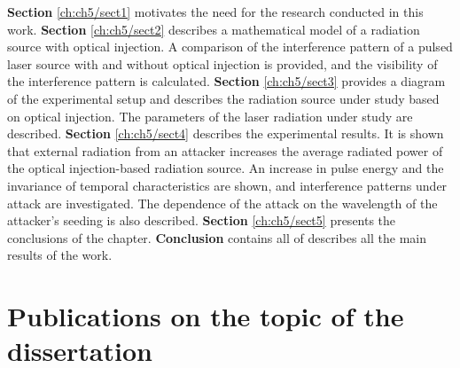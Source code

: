 \newline \textbf{Section} \ref{ch:ch5/sect1} motivates the need for the research conducted in this work.
\newline \textbf{Section} \ref{ch:ch5/sect2} describes a mathematical model of a radiation source with optical injection. A comparison of the interference pattern of a pulsed laser source with and without optical injection is provided, and the visibility of the interference pattern is calculated.
\newline \textbf{Section} \ref{ch:ch5/sect3} provides a diagram of the experimental setup and describes the radiation source under study based on optical injection. The parameters of the laser radiation under study are described.
\newline \textbf{Section} \ref{ch:ch5/sect4} describes the experimental results. It is shown that external radiation from an attacker increases the average radiated power of the optical injection-based radiation source. An increase in pulse energy and the invariance of temporal characteristics are shown, and interference patterns under attack are investigated. The dependence of the attack on the wavelength of the attacker's seeding is also described.
\newline \textbf{Section} \ref{ch:ch5/sect5} presents the conclusions of the chapter.
\newline \textbf {Conclusion} contains all of describes all the main results of the work.
\section*{Publications on the topic of the dissertation}

